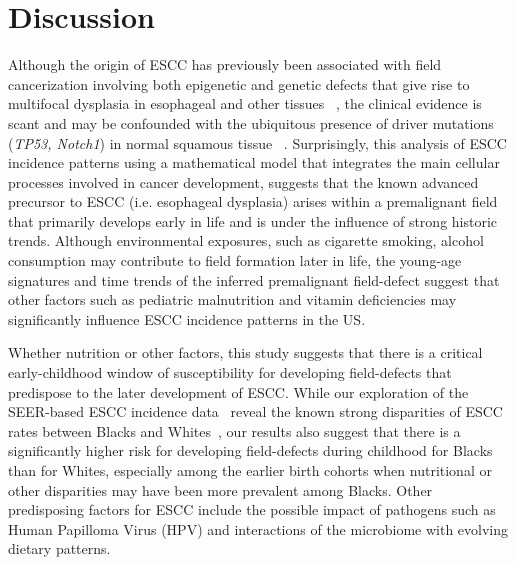 \documentclass[10pt,letterpaper]{article}
\begin{document}
\section*{Discussion}

Although the origin of ESCC has previously been associated with field cancerization involving both epigenetic and genetic defects that give rise to multifocal dysplasia in esophageal and other tissues ~\cite{Slaughter1953,  Ohashi2015}, the clinical evidence is scant and may be confounded with the ubiquitous presence of driver mutations ({\it TP53, Notch1}) in normal squamous tissue ~\cite{Martincorena2018}. Surprisingly, this analysis of ESCC incidence patterns using a mathematical model that integrates the main cellular processes involved in cancer development, suggests that the known advanced precursor to ESCC (i.e. esophageal dysplasia) arises within a premalignant field that primarily develops early in life and is under the influence of strong historic trends. Although environmental exposures, such as cigarette smoking, alcohol consumption may contribute to field formation later in life, the young-age signatures and time trends of the inferred premalignant field-defect suggest that other factors such as pediatric malnutrition and vitamin deficiencies may significantly influence ESCC incidence patterns in the US.

Whether nutrition or other factors, this study suggests that there is a critical early-childhood window of susceptibility for developing field-defects that predispose to the later development of ESCC. While our exploration of the SEER-based ESCC incidence data~\cite{SEER2019} reveal the known strong disparities of ESCC rates between Blacks and Whites~\cite{Brown2001}, our results also suggest that there is a significantly higher risk for developing field-defects during childhood for Blacks than for Whites, especially among the earlier birth cohorts when nutritional or other disparities may have been more prevalent among Blacks. Other predisposing factors for ESCC include the possible impact of pathogens such as Human Papilloma Virus (HPV) \cite{Dinc2020} and interactions of the microbiome with evolving dietary patterns. 
\end{document}
